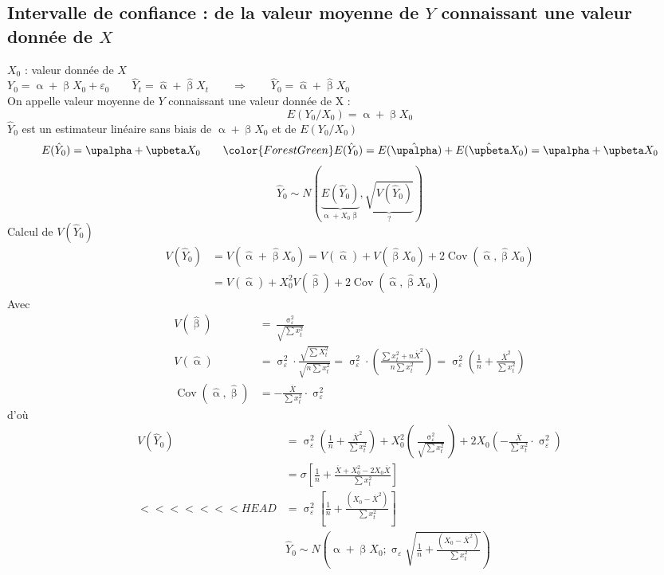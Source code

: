 \documentclass{article}
\newcommand{\hbeta}{\hat{\upbeta}}
\newcommand{\halpha}{\hat{\upalpha}}
\newcommand{\sig}{\upsigma_\varepsilon^2}
\begin{document}
 \subsection{Intervalle de confiance : de la valeur moyenne de $Y$ connaissant une valeur donnée de $X$}
 $X_0$ : valeur donnée de $X$\\
 $Y_0 = \upalpha + \upbeta X_0 + \varepsilon_0 \qquad \hat{Y}_t = \halpha + \hbeta X_t \qquad \Rightarrow \qquad \hat{Y}_0  = \halpha + \hbeta X_0$ \\
 On appelle valeur moyenne de $Y$ connaissant une valeur donnée de X : 
 \[E\left(Y_0/X_0\right) = \upalpha + \upbeta X_0\]
 $\hat{Y}_0$ est un estimateur linéaire sans biais de $\upalpha + \upbeta X_0$ et de $E\left(Y_0/X_0\right)$
 \[E(\hat{Y}_0) = \upalpha + \upbeta X_0 \qquad {\color{ForestGreen}E(\hat{Y}_0) = E(\halpha) + E(\hbeta X_0) = \upalpha + \upbeta X_0}\]
 \[\hat{Y}_0 \sim N\left(\underbrace{E\left(\hat{Y}_0\right)}_{\upalpha + X_0 \upbeta}, \underbrace{\sqrt{V\left(\hat{Y}_0\right)}}_?\right)\]
 Calcul de $V(\hat{Y}_0)$
 \begin{equation*}
 	\begin{split}
 	V(\hat{Y}_0) &= V(\halpha + \hbeta	X_0) = V(\halpha) + V(\hbeta X_0) + 2 \operatorname{Cov} (\halpha, \hbeta X_0) \\
 	&= V(\halpha) + X_0^2 V(\hbeta) + 2 \operatorname{Cov} (\halpha, \hbeta X_0) 	
 	\end{split}
 \end{equation*}
 Avec
 \begin{equation*}
 \begin{split}
 V(\hbeta) &= \frac{\sig}{\sqrt{\sum x_t^2}} \\
 V(\halpha) &= \sig \cdot \frac{\sqrt{\sum X_t^2}}{\sqrt{n \sum x_t^2}} = \sig \cdot \left(\frac{\sum x_t^2 + n \overline{X}^2}{n \sum x_t^2}\right) = \sig \left(\frac{1}{n} + \frac{\overline{X}^2}{\sum x_t^2}\right) \\
 \operatorname{Cov} (\halpha, \hbeta) &= - \frac{\overline{X}}{\sum x_t^2} \cdot \sig 	
 \end{split}
 \end{equation*}
 d'où
 \begin{equation*}
 	\begin{split}
		V(\hat{Y}_0) &= \sig \left(\frac{1}{n} + \frac{\overline{X}^2}{\sum x_t^2}\right) + X_0^2 \left(\frac{\sig}{\sqrt{\sum x_t^2}}\right) + 2 X_0 \left(- \frac{\overline{X}}{\sum x_t^2} \cdot \sig 	\right) \\
		&= \sigma \left[\frac{1}{n} + \frac{\overline{X} + X_0^2 - 2 X_0\overline{X}}{\sum x_t^2}\right] \\
<<<<<<< HEAD
		&= \sig \left[\frac{1}{n} + \frac{(X_0-\overline{X}^2)}{\sum x_t^2}\right] \\
		&\boxed{\hat{Y}_0 \sim N \left(\upalpha + \upbeta X_0 ;  \upsigma_\varepsilon \sqrt{\frac{1}{n} + \frac{(X_0-\overline{X}^2)}{\sum x_t^2}}\right)}
 	\end{split}
 \end{equation*}
\end{document}
